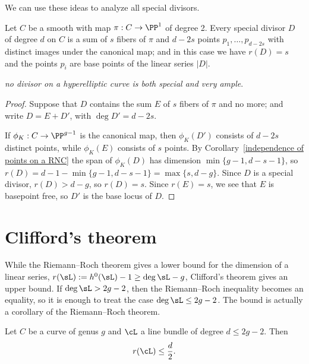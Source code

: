 We can use these ideas to analyze all special divisors.
%
%

\begin{corollary}\label{special on hyperelliptic} Let $C$ be a smooth 
%
with map $\pi: C\to \PP^1$ of degree 2.
Every special divisor $D$ of degree $d$ on 
$C$ is a sum of $s$ fibers of $\pi$ and $d-2s$ points
$p_1,\dots,p_{d-2s}$ with distinct images under the canonical map; and
in this case we have $r(D) = s$ and the points $p_i$ are base points
of the linear series $|D|$.
\end{corollary}

\emph{no divisor on a hyperelliptic curve is both special and very ample}.

\begin{proof}
Suppose that $D$ contains the sum $E$ of $s$ fibers of $\pi$ and no more; and write $D = E+D'$, with $\deg D' = d-2s$.
 
If $\phi_K:C \to \PP^{g-1}$ is the canonical map, then $\phi_K(D')$ consists of $d-2s$ distinct points, while $\phi_K(E)$ consists of
$s$ points. By Corollary~\ref{independence of points on a RNC} the span of $\phi_K(D)$ has dimension $\min\{g-1, d-s-1\}$, so 
$r(D) = d-1-\min\{g-1, d-s-1\} = \max \{s,d-g\}$. Since $D$ is a special divisor, $r(D) > d-g$, so $r(D) = s$. 
Since $r(E) =s$, we see that $E$ is basepoint free, so $D'$ is the base locus of $D$.
\end{proof}

\section{Clifford's theorem}\label{Clifford Section}

While the Riemann--Roch theorem gives a lower bound for the dimension of a linear series, $r(\sL) := h^0(\sL)-1 \geq \deg \sL -g$, Clifford's theorem
%
gives an upper bound. If $\deg \sL>2g-2$, then the Riemann--Roch
inequality becomes an equality, so it is enough to treat the case
$\deg \sL \leq 2g-2$. The bound is actually a corollary of the 
Riemann--Roch theorem.

\begin{corollary}\label{Clifford bound}
 Let $C$ be a curve of genus $g$ and $\cL$ a line bundle of degree $d \leq 2g-2$. Then
$$
r(\cL) \leq \frac{d}{2}.
$$
\end{corollary}

